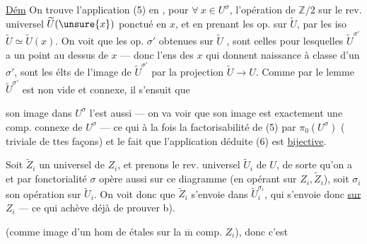 \uline{Dém} On trouve l'application (5) en
, pour $\forall\ x\in U^\sigma$, l'opération  de
$\mathbb Z/2$ sur le rev. universel $\widetilde U(\unsure{x})$ ponctué
en $x$, et en  prenant les
op.  sur $\widetilde U$,  par
les iso $\widetilde U\simeq\widetilde U(x)$. On voit que
les  op. $\sigma'$ obtenues sur $\widetilde U$ , sont
celles pour lesquelles  $\widetilde U^{\sigma'}$ a un
point au dessus de $x$ --- donc l'ens
des $x$ qui donnent naissance à 
classe d'un $\sigma'$, sont les élts de
l'image de $\widetilde U^{\sigma'}$ par la projection
$\widetilde U\longrightarrow U$. Comme par le lemme $\widetilde U^{\sigma'}$
est non vide et connexe, il s'ensuit que

son image dans $U^\sigma$ l'est aussi --- on va
voir que son image est exactement une comp.
connexe de $U^\sigma$ --- ce qui à la fois 
la factorisabilité de (5) par  $\pi_0(U^\sigma)$
( triviale de ttes façons) et le fait que
l'application déduite (6) est \uline{bijective}.

Soit $\widetilde Z_i$ un  universel de $Z_i$,
et prenons le rev. universel 
$\widetilde U_i$ de $U$, de sorte qu'on a
et par fonctorialité $\sigma$ opère aussi sur ce
diagramme (en opérant  sur $Z_i,\widetilde Z_i$),
soit $\sigma_i$ son opération sur $\widetilde U_i$. On
voit donc que $\widetilde Z_i$ s'envoie dans $\widetilde U_i^{\sigma_i}$,
qui s'envoie donc \uline{sur} $Z_i$ --- ce qui achève
déjà de prouver b).

(comme image d'un hom de 
étales sur la $\overline{\mathrm m}$ comp. $Z_i$), donc c'est

